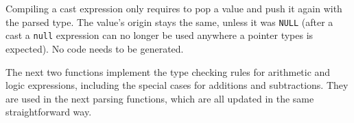 Compiling a cast expression only requires to pop a value and push it again with
the parsed type. The value's origin stays the same, unless it was {\tt NULL}
(after a cast a {\tt null} expression can no longer be used anywhere a pointer
types is expected). No code needs to be generated.


The next two functions implement the type checking rules for arithmetic and
logic expressions, including the special cases for additions and subtractions.
They are used in the next parsing functions, which are all updated in the same
straightforward way.

